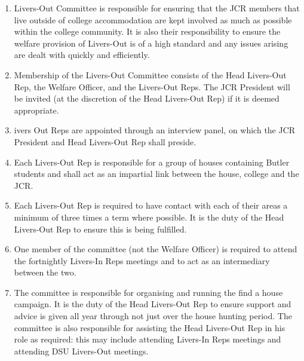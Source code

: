 \begin{enumerate}
    \item Livers-Out Committee is responsible for ensuring that the JCR members that live outside of college accommodation are kept involved as much as possible within the college community. It is also their responsibility to ensure the welfare provision of Livers-Out is of a high standard and any issues arising are dealt with quickly and efficiently.
    \item Membership of the Livers-Out Committee consists of the Head Livers-Out Rep, the Welfare Officer, and the Livers-Out Reps. The JCR President will be invited (at the discretion of the Head Livers-Out Rep) if it is deemed appropriate.
    \item ivers Out Reps are appointed through an interview panel, on which the JCR President and Head Livers-Out Rep shall preside.
    \item Each Livers-Out Rep is responsible for a group of houses containing Butler students and shall act as an impartial link between the house, college and the JCR.
    \item Each Livers-Out Rep is required to have contact with each of their areas a minimum of three times a term where possible. It is the duty of the Head Livers-Out Rep to ensure this is being fulfilled.
    \item One member of the committee (not the Welfare Officer) is required to attend the fortnightly Livers-In Reps meetings and to act as an intermediary between the two.
    \item The committee is responsible for organising and running the find a house campaign. It is the duty of the Head Livers-Out Rep to ensure support and advice is given all year through not just over the house hunting period. The committee is also responsible for assisting the Head Livers-Out Rep in his role as required: this may include attending Livers-In Reps meetings and attending DSU Livers-Out meetings.
\end{enumerate}



